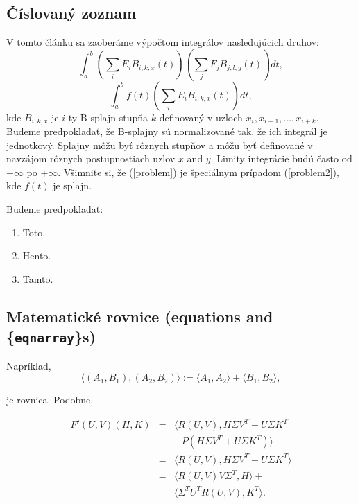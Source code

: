 \documentclass{svk_long_sk}
\begin{document}
\subsection{Číslovaný zoznam}
V tomto článku sa zaoberáme výpočtom integrálov nasledujúcich druhov:
\begin{equation}
\int_a^b \left( \sum_i E_i B_{i,k,x}(t) \right)
         \left( \sum_j F_j B_{j,l,y}(t) \right) dt,\label{problem}
\end{equation}
\begin{equation}
\int_a^b f(t) \left( \sum_i E_i B_{i,k,x}(t) \right) dt,\label{problem2}
\end{equation}
kde $B_{i,k,x}$ je $i$-ty B-splajn stupňa $k$ definovaný v uzloch
$x_i, x_{i+1}, \ldots, x_{i+k}$.
Budeme predpokladať, že B-splajny sú normalizované tak, že ich integrál je 
jednotkový.
Splajny môžu byť rôznych stupňov a môžu byť definované v navzájom rôznych 
postupnostiach uzlov
$x$ and $y$.
Limity integrácie budú často
od $-\infty$ po
$+\infty$. Všimnite si, že (\ref{problem}) je špeciálnym prípadom
(\ref{problem2}),
kde $f(t)$ je splajn.

Budeme predpokladať:
\begin{enumerate}
\item Toto.
\item Hento.
\item Tamto.
\end{enumerate}

\subsection{Matematické rovnice (equations and \{{\tt eqnarray}\}s)}

Napríklad,
\begin{equation}
\langle (A_{1},B_{1}), (A_{2},B_{2})\rangle := \langle A_{1},A_{2}\rangle 
+ \langle B_{1},B_{2}\rangle,\label{eq2.10}
\end{equation}

je rovnica. Podobne,

\begin{eqnarray}
 F'(U,V)(H,K) &=& \langle R(U,V),H\Sigma V^{T} + U\Sigma K^{T}\nonumber\\
             && - P(H\Sigma V^{T} + U\Sigma K^{T})\rangle \nonumber \\
         &=& \langle R(U,V),H\Sigma V^{T} + U\Sigma K^{T}\rangle\nonumber \\
&=& \langle R(U,V)V\Sigma^{T},H\rangle + \nonumber\\
  &&    \langle \Sigma^{T}U^{T}R(U,V),K^{T}\rangle.    \label{eq2.11}
\end{eqnarray}
\end{document}
